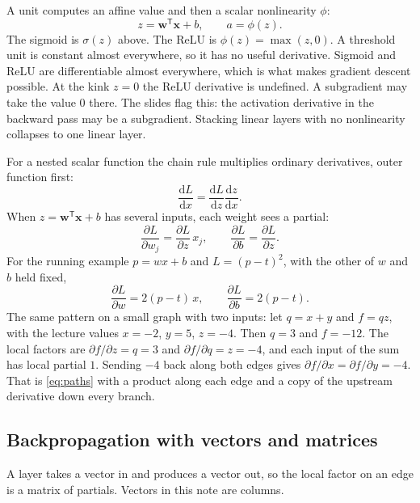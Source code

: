\documentclass[11pt]{article}
\begin{document}
A unit computes an affine value and then a scalar nonlinearity $\phi$:
\begin{equation}
z=\mathbf{w}^{\mathsf T}\mathbf{x}+b,
\qquad
a=\phi(z).
\end{equation}
The sigmoid is $\sigma(z)$ above. The ReLU is $\phi(z)=\max(z,0)$. A threshold unit is constant almost everywhere, so it has no useful derivative. Sigmoid and ReLU are differentiable almost everywhere, which is what makes gradient descent possible. At the kink $z=0$ the ReLU derivative is undefined. A subgradient may take the value $0$ there. The slides flag this: the activation derivative in the backward pass may be a subgradient. Stacking linear layers with no nonlinearity collapses to one linear layer.

For a nested scalar function the chain rule multiplies ordinary derivatives, outer function first:
\begin{equation}
\frac{\mathrm{d}L}{\mathrm{d}x}
=
\frac{\mathrm{d}L}{\mathrm{d}z}\frac{\mathrm{d}z}{\mathrm{d}x}.
\end{equation}
When $z=\mathbf{w}^{\mathsf T}\mathbf{x}+b$ has several inputs, each weight sees a partial:
\begin{equation}
\frac{\partial L}{\partial w_j}
=
\frac{\partial L}{\partial z}\,x_j,
\qquad
\frac{\partial L}{\partial b}
=
\frac{\partial L}{\partial z}.
\end{equation}
For the running example $p=wx+b$ and $L=(p-t)^2$, with the other of $w$ and $b$ held fixed,
\begin{equation}
\frac{\partial L}{\partial w}=2(p-t)\,x,
\qquad
\frac{\partial L}{\partial b}=2(p-t).
\end{equation}
The same pattern on a small graph with two inputs: let $q=x+y$ and $f=qz$, with the lecture values $x=-2$, $y=5$, $z=-4$. Then $q=3$ and $f=-12$. The local factors are $\partial f/\partial z=q=3$ and $\partial f/\partial q=z=-4$, and each input of the sum has local partial $1$. Sending $-4$ back along both edges gives $\partial f/\partial x=\partial f/\partial y=-4$. That is \eqref{eq:paths} with a product along each edge and a copy of the upstream derivative down every branch.

\subsection{Backpropagation with vectors and matrices}

A layer takes a vector in and produces a vector out, so the local factor on an edge is a matrix of partials. Vectors in this note are columns.
\end{document}
